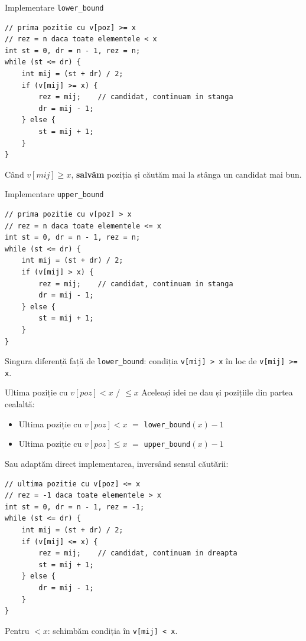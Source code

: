 ﻿\documentclass{beamer}
\begin{document}
\begin{frame}[fragile]{Implementare \texttt{lower\_bound}}
  \begin{lstlisting}
// prima pozitie cu v[poz] >= x
// rez = n daca toate elementele < x
int st = 0, dr = n - 1, rez = n;
while (st <= dr) {
    int mij = (st + dr) / 2;
    if (v[mij] >= x) {
        rez = mij;    // candidat, continuam in stanga
        dr = mij - 1;
    } else {
        st = mij + 1;
    }
}
  \end{lstlisting}
  Când $v[mij] \geq x$, \textbf{salvăm} poziția și căutăm mai la stânga un candidat mai bun.
\end{frame}

\begin{frame}[fragile]{Implementare \texttt{upper\_bound}}
  \begin{lstlisting}
// prima pozitie cu v[poz] > x
// rez = n daca toate elementele <= x
int st = 0, dr = n - 1, rez = n;
while (st <= dr) {
    int mij = (st + dr) / 2;
    if (v[mij] > x) {
        rez = mij;    // candidat, continuam in stanga
        dr = mij - 1;
    } else {
        st = mij + 1;
    }
}
  \end{lstlisting}
  Singura diferență față de \texttt{lower\_bound}: condiția \lstinline|v[mij] > x| în loc de \lstinline|v[mij] >= x|.
\end{frame}

\begin{frame}{Ultima poziție cu $v[poz] < x$ / $\leq x$}
  Aceleași idei ne dau și pozițiile din partea cealaltă:
  \begin{itemize}
    \item Ultima poziție cu $v[poz] < x$ $=$ \texttt{lower\_bound}$(x) - 1$
    \item Ultima poziție cu $v[poz] \leq x$ $=$ \texttt{upper\_bound}$(x) - 1$
  \end{itemize}
  Sau adaptăm direct implementarea, inversând sensul căutării:
  \begin{lstlisting}
// ultima pozitie cu v[poz] <= x
// rez = -1 daca toate elementele > x
int st = 0, dr = n - 1, rez = -1;
while (st <= dr) {
    int mij = (st + dr) / 2;
    if (v[mij] <= x) {
        rez = mij;    // candidat, continuam in dreapta
        st = mij + 1;
    } else {
        dr = mij - 1;
    }
}
  \end{lstlisting}
  Pentru $< x$: schimbăm condiția în \lstinline|v[mij] < x|.
\end{frame}

\end{document}
